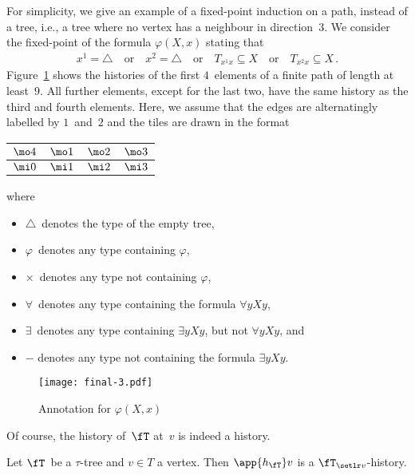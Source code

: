 \documentclass{LMCS}
\renewcommand{\phi}{\varphi}
\begin{document}
\begin{exa}\label{ex:paths}
For simplicity, we give an example of a fixed-point induction on
a path, instead of a tree, i.e., a tree where no vertex has a neighbour
in direction~$3$.
We consider the fixed-point of the formula $\varphi(X,x)$
stating that
\begin{align*}
  x^1 = \triangle \quad\text{or}\quad
  x^2 = \triangle \quad\text{or}\quad
  T_{x^1x} \subseteq X \quad\text{or}\quad
  T_{x^2x} \subseteq X\,.
\end{align*}
Figure~\ref{fig:annotated word} shows the histories of the
first $4$~elements of a finite path of length at least~$9$.
All further elements, except for the last two,
have the same history as the third and fourth elements.
Here, we assume that the edges are alternatingly labelled by $1$~and~$2$
and the tiles are drawn in the format
\begin{center}
\begin{tabular}{|c|c|c|c|}
\hline
$\mo4$&$\mo1$&$\mo2$&$\mo3$\\
\hline
$\mi0$&$\mi1$&$\mi2$&$\mi3$\\
\hline
\end{tabular}
\end{center}
where
\begin{itemize}\parskip=0pt\itemsep=0pt\item $\triangle$~denotes the type of the empty tree,
\item $\phi$~denotes any type containing $\phi$,
\item $\times$~denotes any type not containing $\phi$,
\item $\forall$~denotes any type containing the formula $\forall yXy$,
\item $\exists$~denotes any type containing $\exists yXy$,
  but not $\forall yXy$, and
\item $-$ denotes any type not containing the formula $\exists yXy$. 
\end{itemize}
\begin{figure}\centering
\texttt{[image: final-3.pdf]}
\caption{Annotation for $\varphi(X,x)$\label{fig:annotated word}}
\end{figure}
\end{exa}


Of course, the history of~$\fT$ at~$v$ is indeed a history.
\begin{lem}\label{lem:history is such}
Let $\fT$~be a $\tau$-tree and $v \in T$ a vertex.
Then $\app{h_{\fT}}v$ is a $\fT_{\setlr v}$-history.
\end{lem}
\end{document}
